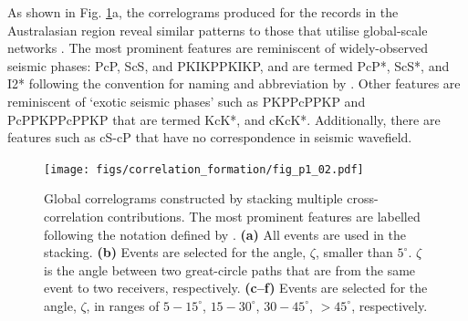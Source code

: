 As shown in Fig. \ref{fig:2.2}a, the correlograms produced for the records in the Australasian region reveal similar patterns to those that utilise global-scale networks  \citep[e.g.,][]{boue_reverberations_2014,pham_earths_2018}. The most prominent features are reminiscent of widely-observed seismic phases: PcP, ScS, and PKIKPPKIKP, and are termed PcP*, ScS*, and I2* following the convention for naming and abbreviation by \citet{tkalcic_shear_2018}. Other features are reminiscent of `exotic seismic phases' such as PKPPcPPKP and PcPPKPPcPPKP that are termed KcK*, and cKcK*. Additionally, there are features such as cS-cP that have no correspondence in seismic wavefield.




\begin{figure}[!hbt]
	\centering
	\texttt{[image: figs/correlation\_formation/fig\_p1\_02.pdf]}
	\caption[Global correlograms built by selecting different receiver pairs]
    {
		Global correlograms constructed by stacking multiple cross-correlation contributions. The most prominent features are labelled following the notation defined by \citet{tkalcic_shear_2018}. \textbf{(a)} All events are used in the stacking. \textbf{(b)} Events are selected for the angle, $\zeta$, smaller than $5^{\circ}$. $\zeta$ is the angle between two great-circle paths that are from the same event to two receivers, respectively. \textbf{(c--f)} Events are selected for the angle, $\zeta$, in ranges of $5-15^{\circ}$, $15-30^{\circ}$, $30-45^{\circ}$, $>45^{\circ}$, respectively.
	}
	\label{fig:2.2}
\end{figure}



